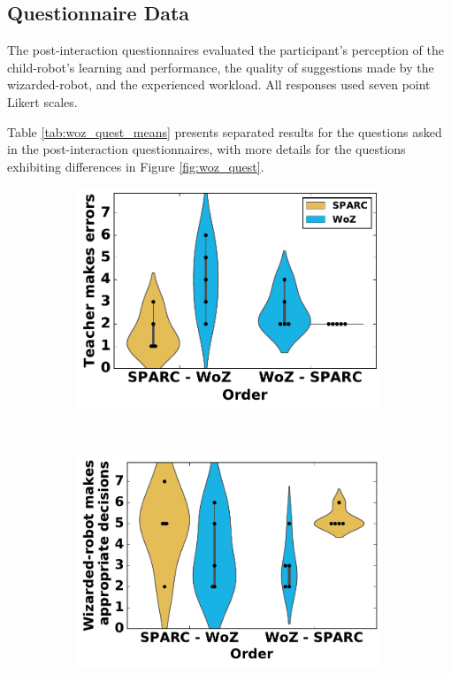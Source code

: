 \subsection{Questionnaire Data}

The post-interaction questionnaires evaluated the participant's perception of the child-robot's learning and performance, the quality of suggestions made by the wizarded-robot, and the experienced workload. All responses used seven point Likert scales.

Table \ref{tab:woz_quest_means} presents separated results for the questions asked in the post-interaction questionnaires, with more details for the questions exhibiting differences in Figure \ref{fig:woz_quest}.

\begin{figure}[ht]
	\centering
	\begin{subfigure}[t]{0.3295\textwidth}
		\centering
		\includegraphics[width=1.\textwidth]{errors.pdf}
	\end{subfigure}%
	~ 
	\begin{subfigure}[t]{0.341\textwidth}
		\centering
		\includegraphics[width=1.\textwidth]{appropriate.pdf}

\end{subfigure}
\end{figure}
